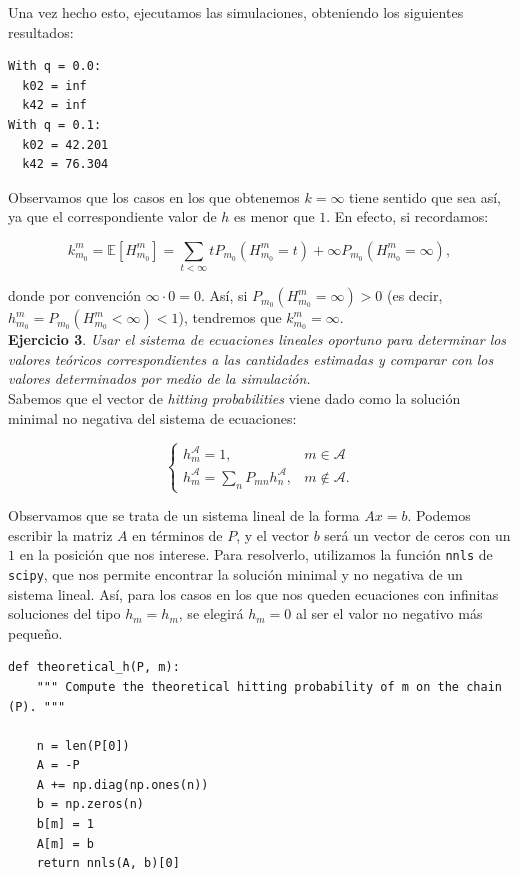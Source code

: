 \documentclass[11pt,a4paper]{article}
\begin{document}
Una vez hecho esto, ejecutamos las simulaciones, obteniendo los siguientes resultados:

\begin{verbatim}
With q = 0.0:
  k02 = inf
  k42 = inf
With q = 0.1:
  k02 = 42.201
  k42 = 76.304
\end{verbatim}

Observamos que los casos en los que obtenemos $k=\infty$ tiene sentido que sea así, ya que el correspondiente valor de $h$ es menor que $1$. En efecto, si recordamos:

\[
k_{m_0}^m = \mathbb E[H_{m_0}^m]= \sum_{t < \infty} t P_{m_0}(H_{m_0}^m=t) + \infty P_{m_0}(H_{m_0}^m = \infty),
\]

donde por convención $\infty\cdot 0=0$. Así, si $P_{m_0}(H_{m_0}^m = \infty) > 0$ (es decir, $h_{m_0}^m = P_{m_0}(H_{m_0}^m<\infty)<1$), tendremos que $k_{m_0}^m = \infty$.\\

\textbf{Ejercicio 3}. \textit{Usar el sistema de ecuaciones lineales oportuno para determinar los valores teóricos correspondientes a las cantidades estimadas y comparar con los valores determinados por medio de la simulación.}\\

Sabemos que el vector de \textit{hitting probabilities} viene dado como la solución minimal no negativa del sistema de ecuaciones:

\[
\begin{cases}
  h_m^{\mathcal A} = 1, & m \in \mathcal A\\
  h_m^{\mathcal A} = \sum_{n} P_{mn}h_n^{\mathcal A}, & m \notin \mathcal A.
\end{cases}
\]

Observamos que se trata de un sistema lineal de la forma $Ax=b$. Podemos escribir la matriz $A$ en términos de $P$, y el vector $b$ será un vector de ceros con un $1$ en la posición que nos interese. Para resolverlo, utilizamos la función \verb|nnls| de \verb|scipy|, que nos permite encontrar la solución minimal y no negativa de un sistema lineal. Así, para los casos en los que nos queden ecuaciones con infinitas soluciones del tipo $h_m=h_m$, se elegirá $h_m=0$ al ser el valor no negativo más pequeño.

\begin{verbatim}
def theoretical_h(P, m):
    """ Compute the theoretical hitting probability of m on the chain (P). """

    n = len(P[0])
    A = -P
    A += np.diag(np.ones(n))
    b = np.zeros(n)
    b[m] = 1
    A[m] = b
    return nnls(A, b)[0]
\end{verbatim}
\end{document}

